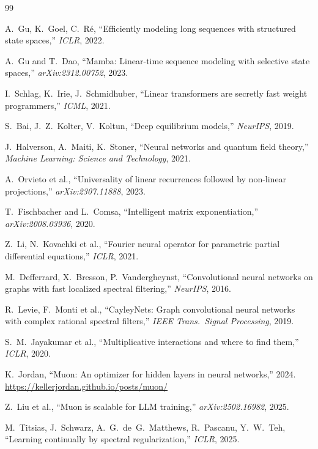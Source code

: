 \documentclass[11pt, a4paper]{article}
\theoremstyle{plain}
\theoremstyle{definition}
\theoremstyle{remark}
\begin{document}
\begin{thebibliography}{99}

A.~Gu, K.~Goel, C.~R\'{e},
``Efficiently modeling long sequences with structured state spaces,''
\emph{ICLR}, 2022.

A.~Gu and T.~Dao,
``Mamba: Linear-time sequence modeling with selective state spaces,''
\emph{arXiv:2312.00752}, 2023.

I.~Schlag, K.~Irie, J.~Schmidhuber,
``Linear transformers are secretly fast weight programmers,''
\emph{ICML}, 2021.

S.~Bai, J.~Z.~Kolter, V.~Koltun,
``Deep equilibrium models,''
\emph{NeurIPS}, 2019.

J.~Halverson, A.~Maiti, K.~Stoner,
``Neural networks and quantum field theory,''
\emph{Machine Learning: Science and Technology}, 2021.

A.~Orvieto et al.,
``Universality of linear recurrences followed by non-linear projections,''
\emph{arXiv:2307.11888}, 2023.

T.~Fischbacher and L.~Comsa,
``Intelligent matrix exponentiation,''
\emph{arXiv:2008.03936}, 2020.

Z.~Li, N.~Kovachki et al.,
``Fourier neural operator for parametric partial differential equations,''
\emph{ICLR}, 2021.

M.~Defferrard, X.~Bresson, P.~Vandergheynst,
``Convolutional neural networks on graphs with fast localized spectral filtering,''
\emph{NeurIPS}, 2016.

R.~Levie, F.~Monti et al.,
``CayleyNets: Graph convolutional neural networks with complex rational spectral filters,''
\emph{IEEE Trans.\ Signal Processing}, 2019.

S.~M.~Jayakumar et al.,
``Multiplicative interactions and where to find them,''
\emph{ICLR}, 2020.

K.~Jordan,
``Muon: An optimizer for hidden layers in neural networks,''
2024.
\url{https://kellerjordan.github.io/posts/muon/}

Z.~Liu et al.,
``Muon is scalable for LLM training,''
\emph{arXiv:2502.16982}, 2025.

M.~Titsias, J.~Schwarz, A.~G.~de~G.~Matthews, R.~Pascanu, Y.~W.~Teh,
``Learning continually by spectral regularization,''
\emph{ICLR}, 2025.


\end{thebibliography}
\end{document}
